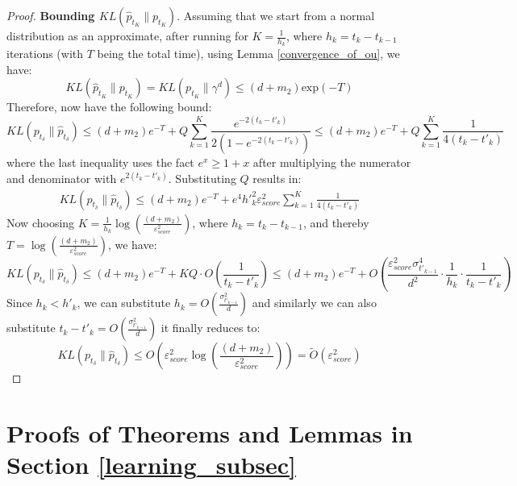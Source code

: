 \documentclass[11pt]{article}
\begin{document}
\begin{proof}
\noindent
\textbf{Bounding $KL(\hat{p}_{t_K}\|p_{t_K})$}. Assuming that we start from a normal distribution as an approximate, after running for $K=\frac{1}{h_k}$, where $h_k=t_k-t_{k-1}$ iterations (with $T$ being the total time), using {Lemma \ref{convergence_of_ou}}, we have:
\[
KL(\hat{p}_{t_K}\|p_{t_K}) = KL(p_{t_K}\|\gamma^d) \leq ({d}+m_2) \text{exp}(-T)
\]
Therefore, now have the following bound:
\[
KL(p_{t_\delta}\|\hat{p}_{t_\delta}) \leq (d+m_2) e^{-T} +  Q \sum_{k=1}^K\frac{e^{-2(t_k-t'_k)}}{2(1-e^{-2(t_k-t'_k)})} \leq (d+m_2) e^{-T} +  Q \sum_{k=1}^K\frac{1}{4{(t_k-t'_k)}}
\]
where the last inequality uses the fact $e^x\geq 1+x$ after multiplying the numerator and denominator with $e^{2(t_k-t'_k)}$. Substituting $Q$ results in:
\begin{align*}
    KL(p_{t_\delta}\|\hat{p}_{t_\delta}) \leq (d+m_2) e^{-T} +  e^4{h'}_k^2\varepsilon^2_{score} \sum_{k=1}^K\frac{1}{4{(t_k-t'_k)}}
\end{align*}
Now choosing $K=\frac{1}{h_k}\log\left(\frac{(d+m_2)}{\varepsilon^2_{score}}\right)$, where $h_k = t_k-t_{k-1}$,  and thereby $T=\log\left(\frac{(d+m_2)}{\varepsilon^2_{score}}\right)$, we have: 
\[
KL(p_{t_\delta}\|\hat{p}_{t_\delta}) \leq (d+m_2) e^{-T} +  KQ \cdot O\left(\frac{1}{t_k-t'_k} \right) \leq (d+m_2) e^{-T} +  O\left({{\frac{\varepsilon^2_{score}\sigma^4_{t'_{k-1}}}{d^2}}{}}\cdot \frac{1}{h_k} \cdot \frac{1}{t_k-t'_k}\right) 
\]
Since $h_k<h'_k$, we can substitute $h_k = O\left(\frac{\sigma^2_{t'_{k-1}}}{d}\right)$ and similarly we can also substitute $t_k-t'_k=O\left(\frac{\sigma^2_{t'_{k-1}}}{d}\right)$ it finally reduces to:
\[
KL(p_{t_\delta}\|\hat{p}_{t_\delta}) \leq {O}\left({\varepsilon^2_{score}}\log\left(\frac{(d+m_2)}{\varepsilon^2_{score}}\right)\right) = \tilde{O}(\varepsilon^2_{score})
\]

\end{proof}




\section{Proofs of Theorems and Lemmas in Section \ref{learning_subsec}}
\label{appendix:Thm3_6}


\vspace{-0.1in}
\noindent
\end{document}
